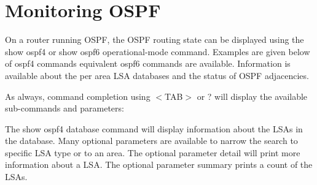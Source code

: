 \newpage
\section{Monitoring OSPF}

On a router running OSPF, the OSPF routing state can be displayed
using the {\stt show ospf4} or {\stt show ospf6} operational-mode
command. Examples are given below of ospf4 commands equivalent ospf6
commands are available. Information is available about the per area
LSA databases and the status of OSPF adjacencies.

As always, command completion using $<$TAB$>$ or ? will display the
available sub-commands and parameters:

\vspace{0.1in}
\noindent{}

The {\stt show ospf4 database} command will display information about the
LSAs in the database. Many optional parameters are available to narrow
the search to specific LSA type or to an area. The optional parameter
{\stt detail} will print more information about a LSA. The optional
parameter {\stt summary} prints a count of the LSAs.

